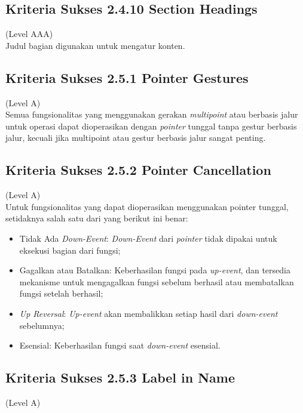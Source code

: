 \subsection{Kriteria Sukses 2.4.10 Section Headings}
\label{subsec:kriteria_2.4.10}
(Level AAA) \\

Judul bagian digunakan untuk mengatur konten.

\subsection{Kriteria Sukses 2.5.1 Pointer Gestures}
\label{subsec:kriteria_2.5.1}
(Level A) \\

Semua fungsionalitas yang menggunakan gerakan \textit{multipoint} atau berbasis jalur untuk operasi dapat dioperasikan dengan \textit{pointer} tunggal tanpa gestur berbasis jalur, kecuali jika multipoint atau gestur berbasis jalur sangat penting.

\subsection{Kriteria Sukses 2.5.2 Pointer Cancellation}
\label{subsec:kriteria_2.5.2}
(Level A) \\

Untuk fungsionalitas yang dapat dioperasikan menggunakan pointer tunggal, setidaknya salah satu dari yang berikut ini benar:

\begin{itemize}
	\item Tidak Ada \textit{Down-Event}: \textit{Down-Event} dari \textit{pointer} tidak dipakai untuk eksekusi bagian dari fungsi;
	\item Gagalkan atau Batalkan: Keberhasilan fungsi pada \textit{up-event}, dan tersedia mekanisme untuk mengagalkan fungsi sebelum berhasil atau membatalkan fungsi setelah berhasil;
	\item \textit{Up Reversal}: \textit{Up-event} akan membalikkan setiap hasil dari \textit{down-event} sebelumnya;
	\item Esensial: Keberhasilan fungsi saat \textit{down-event} esensial.
\end{itemize}

\subsection{Kriteria Sukses 2.5.3 Label in Name}
\label{subsec:kriteria_2.5.3}
(Level A) \\

